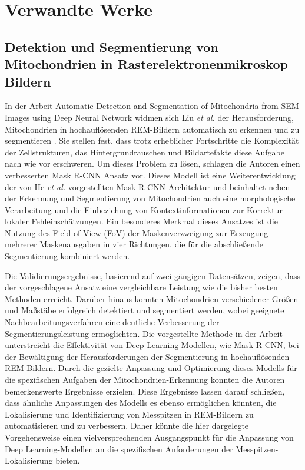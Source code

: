 \clearpage
\chapter{Verwandte Werke}

\section{Detektion und Segmentierung von Mitochondrien in Rasterelektronenmikroskop Bildern}
In der Arbeit \glqq Automatic Detection and Segmentation of Mitochondria from SEM Images using Deep Neural Network\grqq{} widmen sich Liu \textit{et al.} der Herausforderung, Mitochondrien in hochauflösenden REM-Bildern automatisch zu erkennen und zu segmentieren \cite{8512393}. Sie stellen fest, dass trotz erheblicher Fortschritte die Komplexität der Zellstrukturen, das Hintergrundrauschen und Bildartefakte diese Aufgabe nach wie vor erschweren.
Um dieses Problem zu lösen, schlagen die Autoren einen verbesserten Mask R-CNN Ansatz vor. Dieses Modell ist eine Weiterentwicklung der von He \textit{et al.} \cite{He_2017_ICCV} vorgestellten Mask R-CNN Architektur und beinhaltet neben der Erkennung und Segmentierung von Mitochondrien auch eine morphologische Verarbeitung und die Einbeziehung von Kontextinformationen zur Korrektur lokaler Fehleinschätzungen. Ein besonderes Merkmal dieses Ansatzes ist die Nutzung des Field of View (FoV) der Maskenverzweigung zur Erzeugung mehrerer Maskenausgaben in vier Richtungen, die für die abschließende Segmentierung kombiniert werden.

Die Validierungsergebnisse, basierend auf zwei gängigen Datensätzen, zeigen, dass der vorgeschlagene Ansatz eine vergleichbare Leistung wie die bisher besten Methoden erreicht. Darüber hinaus konnten Mitochondrien verschiedener Größen und Maßstäbe erfolgreich detektiert und segmentiert werden, wobei geeignete Nachbearbeitungsverfahren eine deutliche Verbesserung der Segmentierungsleistung ermöglichten.
Die vorgestellte Methode in der Arbeit unterstreicht die Effektivität von Deep Learning-Modellen, wie Mask R-CNN, bei der Bewältigung der Herausforderungen der Segmentierung in hochauflösenden REM-Bildern. Durch die gezielte Anpassung und Optimierung dieses Modells für die spezifischen Aufgaben der Mitochondrien-Erkennung konnten die Autoren bemerkenswerte Ergebnisse erzielen.
Diese Ergebnisse lassen darauf schließen, dass ähnliche Anpassungen des Modells es ebenso ermöglichen könnten, die Lokalisierung und Identifizierung von Messpitzen in REM-Bildern zu automatisieren und zu verbessern. Daher könnte die hier dargelegte Vorgehensweise einen vielversprechenden Ausgangspunkt für die Anpassung von Deep Learning-Modellen an die spezifischen Anforderungen der Messpitzen-Lokalisierung bieten.

